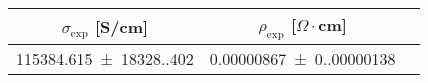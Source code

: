 \begin{tabular}{ccc}
\toprule
$\sigma_{\exp}$ [S/cm] & $\rho_{\exp}$ [$\Omega  \cdot$cm] \\
\midrule
\num{115384.615(18328.402)} & \num{0.00000867(0.00000138)} \\
\bottomrule
\end{tabular}
